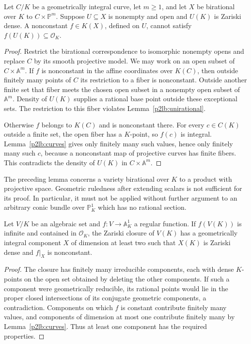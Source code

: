 \begin{lemma}\label{p2lb:ruled}
Let $C/K$ be a geometrically integral curve, let $m\geq1$, and let
$X$ be birational over $K$ to $C\times\mathbb P^m$.
Suppose $U\subseteq X$ is nonempty and open and $U(K)$ is Zariski
dense.  A nonconstant $f\in K(X)$, defined on $U$, cannot satisfy
$f(U(K))\subseteq\mathcal O_K$.
\end{lemma}
\begin{proof}
Restrict the birational correspondence to isomorphic nonempty opens
and replace $C$ by its smooth projective model.  We may work on an
open subset of $C\times\mathbb A^m$.  If $f$ is nonconstant in the
affine coordinates over $K(C)$, then outside finitely many points of
$C$ its restriction to a fiber is nonconstant.  Outside another finite
set that fiber meets the chosen open subset in a nonempty open subset
of $\mathbb A^m$.  Density of $U(K)$ supplies a rational base point
outside these exceptional sets.  The restriction to this fiber violates
Lemma~\ref{p2lb:unirational}.

Otherwise $f$ belongs to $K(C)$ and is nonconstant there.  For every
$c\in C(K)$ outside a finite set, the open fiber has a $K$-point,
so $f(c)$ is integral.  Lemma~\ref{p2lb:curves} gives only finitely
many such values, hence only finitely many such $c$, because a
nonconstant map of projective curves has finite fibers.  This
contradicts the density of $U(K)$ in $C\times\mathbb A^m$.
\end{proof}

\begin{remark}
The preceding lemma concerns a variety birational over $K$ to a
product with projective space.  Geometric ruledness after extending
scalars is not sufficient for its proof.  In particular, it must not
be applied without further argument to an arbitrary conic bundle
over $\mathbb P^1_K$ which has no rational section.
\end{remark}

\begin{lemma}\label{p2lb:dense-component}
Let $V/K$ be an algebraic set and $f:V\to\mathbb A^1_K$ a regular
function.  If $f(V(K))$ is infinite and contained in $\mathcal O_K$,
the Zariski closure of $V(K)$ has a geometrically integral component
$X$ of dimension at least two such that $X(K)$ is Zariski dense
and $f|_X$ is nonconstant.
\end{lemma}
\begin{proof}
The closure has finitely many irreducible components, each with dense
$K$-points on the open set obtained by deleting the other components.
If such a component were geometrically reducible, its rational points
would lie in the proper closed intersections of its conjugate
geometric components, a contradiction.  Components on which $f$ is
constant contribute finitely many values, and components of dimension
at most one contribute finitely many by Lemma~\ref{p2lb:curves}.
Thus at least one component has the required properties.
\end{proof}

